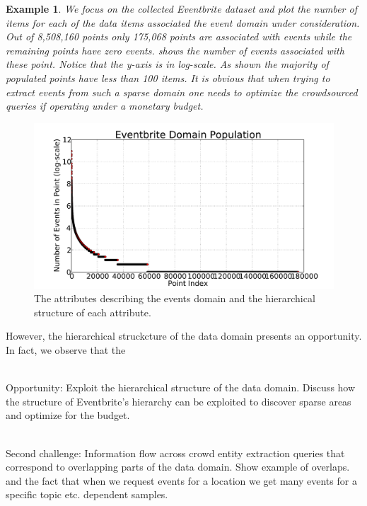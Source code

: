 \documentclass{vldb}
\newtheorem{example}{Example}
\begin{document}
\begin{example}
We focus on the collected Eventbrite dataset and plot the number of items for each of the data items associated the event domain under consideration. Out of 8,508,160 points only 175,068 points are associated with events while the remaining points have zero events.  shows the number of events associated with these point. Notice that the y-axis is in log-scale. As shown the majority of populated points have less than 100 items. It is obvious that when trying to extract events from such a sparse domain one needs to optimize the crowdsourced queries if operating under a monetary budget.
\end{example}

\begin{figure}
	\begin{center}
	\includegraphics[trim=55 0 62 0,clip,scale=0.25]{figs/eventBritePopulationS.pdf}
	\caption{The attributes describing the events domain and the hierarchical structure of each attribute.}
	\label{fig:eventbritepop}
	\vspace{-20pt}
	\end{center}
\end{figure}

However, the hierarchical struckcture of the data domain presents an opportunity. In fact, we observe that the

\ \\Opportunity: Exploit the hierarchical structure of the data domain. Discuss how the structure of Eventbrite's hierarchy can be exploited to discover sparse areas and optimize for the budget.

\ \\Second challenge: Information flow across crowd entity extraction queries that correspond to overlapping parts of the data domain. Show example of overlaps. and the fact that when we request events for a location we get many events for a specific topic etc. dependent samples.
\end{document}
